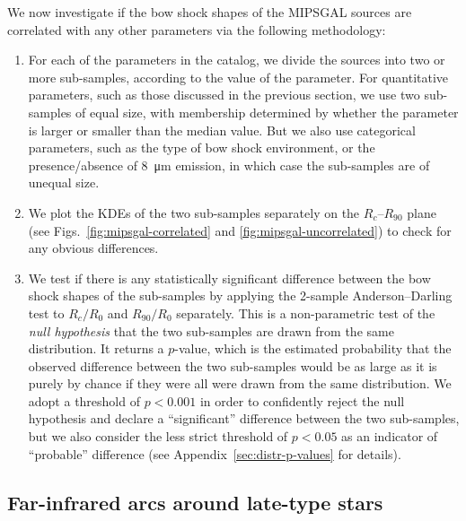 We now investigate if the bow shock shapes of the MIPSGAL sources are
correlated with any other parameters via the following methodology:
\begin{enumerate}[1.]
\item For each of the parameters in the \citet{Kobulnicky:2016a}
  catalog, we divide the sources into two or more sub-samples,
  according to the value of the parameter.  For quantitative
  parameters, such as those discussed in the previous section, we use
  two sub-samples of equal size, with membership determined by whether
  the parameter is larger or smaller than the median value.  But we
  also use categorical parameters, such as the type of bow shock
  environment, or the presence/absence of \SI{8}{\um} emission, in
  which case the sub-samples are of unequal size.
\item We plot the KDEs of the two sub-samples separately on the
  \(R_c\)--\(R_{90}\) plane (see Figs.~\ref{fig:mipsgal-correlated} and
  \ref{fig:mipsgal-uncorrelated}) to check for any obvious
  differences.
\item We test if there is any statistically significant difference
  between the bow shock shapes of the sub-samples by applying the
  2-sample Anderson--Darling test \citep{Anderson:1952a, Scholz:1987a}
  to \(R_c/R_0\) and \(R_{90}/R_0\) separately.  This is a
  non-parametric test of the \textit{null hypothesis} that the two
  sub-samples are drawn from the same distribution.  It returns a
  \(p\)-value, which is the estimated probability that the observed
  difference between the two sub-samples would be as large as it is
  purely by chance if they were all were drawn from the same
  distribution.  We adopt a threshold of \(p < 0.001\) in order to
  confidently reject the null hypothesis and declare a ``significant''
  difference between the two sub-samples, but we also consider the
  less strict threshold of \(p < 0.05\) as an indicator of
  ``probable'' difference (see Appendix~\ref{sec:distr-p-values} for
  details).
\end{enumerate}

\subsection{Far-infrared arcs around late-type stars}
\label{sec:far-infrared-arcs}

